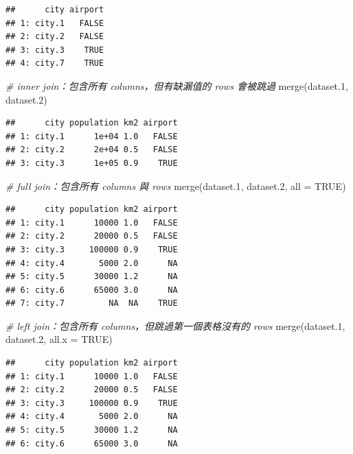 \documentclass[
]{book}
\newenvironment{Shaded}{\begin{snugshade}}{\end{snugshade}}
\newcommand{\AttributeTok}[1]{\textcolor[rgb]{0.77,0.63,0.00}{#1}}
\newcommand{\CommentTok}[1]{\textcolor[rgb]{0.56,0.35,0.01}{\textit{#1}}}
\newcommand{\ConstantTok}[1]{\textcolor[rgb]{0.00,0.00,0.00}{#1}}
\newcommand{\FloatTok}[1]{\textcolor[rgb]{0.00,0.00,0.81}{#1}}
\newcommand{\FunctionTok}[1]{\textcolor[rgb]{0.00,0.00,0.00}{#1}}
\newcommand{\NormalTok}[1]{#1}
\theoremstyle{definition}
\theoremstyle{remark}
\begin{document}
\begin{verbatim}
##      city airport
## 1: city.1   FALSE
## 2: city.2   FALSE
## 3: city.3    TRUE
## 4: city.7    TRUE
\end{verbatim}

\begin{Shaded}
\begin{Highlighting}[]
\CommentTok{\# inner join：包含所有 columns，但有缺漏值的 rows 會被跳過}
\FunctionTok{merge}\NormalTok{(dataset}\FloatTok{.1}\NormalTok{, dataset}\FloatTok{.2}\NormalTok{)}
\end{Highlighting}
\end{Shaded}

\begin{verbatim}
##      city population km2 airport
## 1: city.1      1e+04 1.0   FALSE
## 2: city.2      2e+04 0.5   FALSE
## 3: city.3      1e+05 0.9    TRUE
\end{verbatim}

\begin{Shaded}
\begin{Highlighting}[]
\CommentTok{\# full join：包含所有 columns 與 rows}
\FunctionTok{merge}\NormalTok{(dataset}\FloatTok{.1}\NormalTok{, dataset}\FloatTok{.2}\NormalTok{, }\AttributeTok{all =} \ConstantTok{TRUE}\NormalTok{)}
\end{Highlighting}
\end{Shaded}

\begin{verbatim}
##      city population km2 airport
## 1: city.1      10000 1.0   FALSE
## 2: city.2      20000 0.5   FALSE
## 3: city.3     100000 0.9    TRUE
## 4: city.4       5000 2.0      NA
## 5: city.5      30000 1.2      NA
## 6: city.6      65000 3.0      NA
## 7: city.7         NA  NA    TRUE
\end{verbatim}

\begin{Shaded}
\begin{Highlighting}[]
\CommentTok{\# left join：包含所有 columns，但跳過第一個表格沒有的 rows}
\FunctionTok{merge}\NormalTok{(dataset}\FloatTok{.1}\NormalTok{, dataset}\FloatTok{.2}\NormalTok{, }\AttributeTok{all.x =} \ConstantTok{TRUE}\NormalTok{)}
\end{Highlighting}
\end{Shaded}

\begin{verbatim}
##      city population km2 airport
## 1: city.1      10000 1.0   FALSE
## 2: city.2      20000 0.5   FALSE
## 3: city.3     100000 0.9    TRUE
## 4: city.4       5000 2.0      NA
## 5: city.5      30000 1.2      NA
## 6: city.6      65000 3.0      NA
\end{verbatim}
\end{document}
